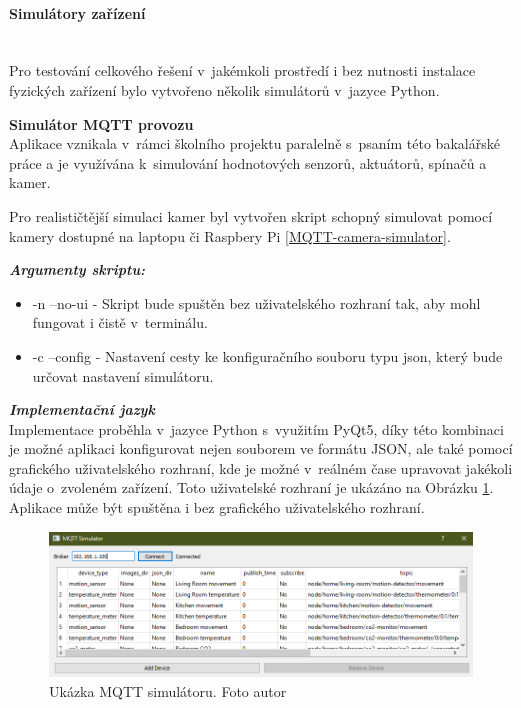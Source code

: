 \paragraph*{Simulátory zařízení}\mbox{} \\
Pro testování celkového řešení v~jakémkoli prostředí i bez nutnosti instalace fyzických zařízení bylo vytvořeno několik simulátorů v~jazyce Python.

\noindent\textbf{Simulátor MQTT provozu}\mbox{} \\ \label{MQTT-simulator}
Aplikace vznikala v~rámci školního projektu paralelně s~psaním této bakalářské práce a je využívána k~simulování hodnotových senzorů, aktuátorů, spínačů a kamer. 

Pro realističtější simulaci kamer byl vytvořen skript schopný simulovat pomocí kamery dostupné na laptopu či Raspbery Pi \ref{MQTT-camera-simulator}. 

\noindent\emph{\textbf{Argumenty skriptu:}}
\begin{itemize}
  \item -n --no-ui - Skript bude spuštěn bez uživatelského rozhraní tak, aby mohl fungovat i čistě v~terminálu.
  \item -c --config - Nastavení cesty ke konfiguračního souboru typu json, který bude určovat nastavení simulátoru.
\end{itemize}

\noindent\emph{\textbf{Implementační jazyk}}\mbox{} \\
Implementace proběhla v~jazyce Python s~využitím PyQt5, díky této kombinaci je možné aplikaci konfigurovat nejen souborem ve formátu JSON, ale také pomocí grafického uživatelského rozhraní, kde je možné v~reálném čase upravovat jakékoli údaje o~zvoleném zařízení. Toto uživatelské rozhraní je ukázáno na Obrázku \ref{mqttSimulatorShowcase}. Aplikace může být spuštěna i bez grafického uživatelského rozhraní.

\begin{figure}[H]
  \centering
  \includegraphics[width=\textwidth]{obrazky-figures/software/mqttSimulator.PNG}
  \caption{Ukázka MQTT simulátoru. Foto autor}
  \label{mqttSimulatorShowcase}
\end{figure}

